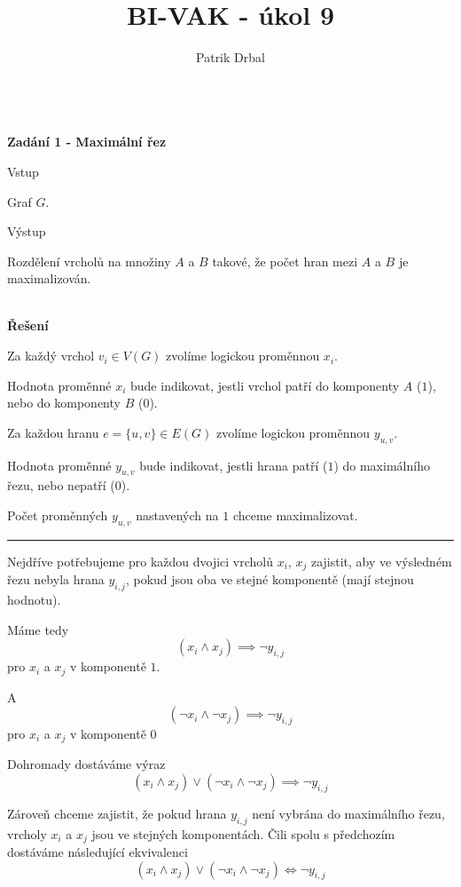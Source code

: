 \documentclass{article}
\title{BI-VAK - úkol 9}
\author{Patrik Drbal}
\begin{document}
\maketitle

\textbf {\\Zadání 1 - Maximální řez\\}

\begin{center}
Vstup
\end{center}
Graf $G$.

\begin{center}
Výstup
\end{center}
Rozdělení vrcholů na množiny $A$ a $B$ takové, že počet hran mezi $A$ a $B$ je maximalizován.

\textbf {\\Řešení\\}

Za každý vrchol $v_i \in V(G)$ zvolíme logickou proměnnou $x_i$.

Hodnota proměnné $x_i$ bude indikovat, jestli vrchol patří do komponenty $A$ ($1$), nebo do komponenty $B$ ($0$).

\vspace{5mm}
Za každou hranu $e = \{u,v\} \in E(G)$ zvolíme logickou proměnnou $y_{u,v}$.

Hodnota proměnné $y_{u,v}$ bude indikovat, jestli hrana patří ($1$) do maximálního řezu, nebo nepatří ($0$).

Počet proměnných $y_{u,v}$ nastavených na $1$ chceme maximalizovat.

\vspace{5mm}
\hrule\vspace{5mm}
Nejdříve potřebujeme pro každou dvojici vrcholů $x_i$, $x_j$ zajistit, aby ve výsledném řezu nebyla hrana $y_{i,j}$, pokud jsou oba ve stejné komponentě (mají stejnou hodnotu).

\vspace{5mm}
Máme tedy
\[ (x_i \land x_j) \implies \neg y_{i,j} \]
pro $x_i$ a $x_j$ v komponentě $1$.

A
\[ (\neg x_i \land  \neg x_j) \implies \neg y_{i,j} \]
pro $x_i$ a $x_j$ v komponentě $0$

Dohromady dostáváme výraz
\[ (x_i \land x_j) \vee (\neg x_i \land  \neg x_j) \implies \neg y_{i,j} \]

\vspace{5mm}
Zároveň chceme zajistit, že pokud hrana $y_{i,j}$ není vybrána do maximálního řezu, vrcholy $x_i$ a $x_j$ jsou ve stejných komponentách. Čili spolu s předchozím dostáváme následující ekvivalenci
\[ (x_i \land x_j) \vee (\neg x_i \land  \neg x_j) \iff \neg y_{i,j} \]
\end{document}
